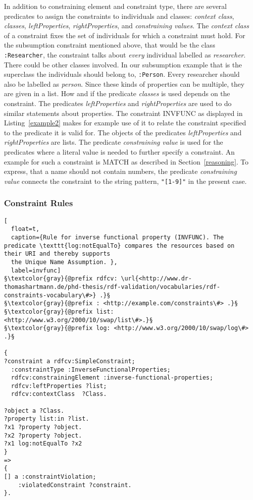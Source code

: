 In addition to constraining element and constraint type, there are several predicates to assign the constraints to individuals and classes: \emph{context class}, 
\emph{classes}, 
\emph{leftProperties}, 
\emph{rightProperties}, and \emph{constraining values}.
The \emph{context class} of a constraint fixes the set of individuals for which a constraint must hold. For the subsumption constraint mentioned above, that would be 
the class \texttt{:Researcher}, the constraint talks about \emph{every} individual labelled as \emph{researcher}. 
There could be other classes involved. In our subsumption example that is the superclass the  
individuals should belong to, \texttt{:Person}. Every researcher should also be labelled as \emph{person}. %
Since these kinds of properties can be multiple, 
they are given in a
list. How and if the predicate  \emph{classes} is used depends on the constraint.
The predicates \emph{leftProperties} and \emph{rightProperties} are used to do similar statements about properties. The constraint INVFUNC as displayed in 
Listing~\ref{example2} makes for example use of it to 
relate the constraint specified to the predicate it is valid for. The objects of the predicates \emph{leftProperties} and \emph{rightProperties} are lists. The predicate 
\emph{constraining value}
 is used for the predicates where a literal value is needed to further specify a constraint. An example for such a constraint is MATCH as described in Section~\ref{reasoning}. To 
 express, that a name should not contain numbers, the predicate \emph{constraining value} connects the constraint to the string pattern,
 \texttt{"[1-9]"} in the present case. 



\subsubsection{Constraint Rules}\label{rules}
\begin{lstlisting}[
  float=t,
  caption={Rule for inverse functional property (INVFUNC). The predicate \texttt{log:notEqualTo} compares the resources based on their URI and thereby supports 
  the Unique Name Assumption. },
  label=invfunc]
§\textcolor{gray}{@prefix rdfcv: \url{<http://www.dr-thomashartmann.de/phd-thesis/rdf-validation/vocabularies/rdf-constraints-vocabulary\#>} .}§
§\textcolor{gray}{@prefix : <http://example.com/constraints\#> .}§
§\textcolor{gray}{@prefix list: <http://www.w3.org/2000/10/swap/list\#>.}§
§\textcolor{gray}{@prefix log: <http://www.w3.org/2000/10/swap/log\#> .}§

{
?constraint a rdfcv:SimpleConstraint;
  :constraintType :InverseFunctionalProperties;
  rdfcv:constrainingElement :inverse-functional-properties;
  rdfcv:leftProperties ?list;
  rdfcv:contextClass  ?Class.
  
?object a ?Class.
?property list:in ?list.
?x1 ?property ?object.
?x2 ?property ?object.
?x1 log:notEqualTo ?x2
}
=>
{
[] a :constraintViolation;
    :violatedConstraint ?constraint.
}.
\end{lstlisting}


